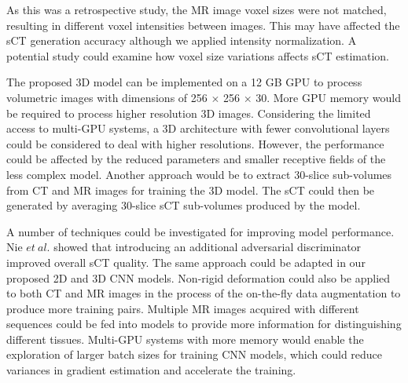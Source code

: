 As this was a retrospective study, the MR image voxel sizes were not matched, resulting in different voxel intensities between images. This may have affected the sCT generation accuracy although we applied intensity normalization. A potential study could examine how voxel size variations affects sCT estimation. 

The proposed 3D model can be implemented on a 12 GB GPU to process volumetric images with dimensions of 256 $\times$ 256 $\times$ 30. More GPU memory would be required to process higher resolution 3D images. Considering the limited access to multi-GPU systems, a 3D architecture with fewer convolutional layers could be considered to deal with higher resolutions. However, the performance could be affected by the reduced parameters and smaller receptive fields of the less complex model. Another approach would be to extract 30-slice sub-volumes from CT and MR images for training the 3D model. The sCT could then be generated by averaging 30-slice sCT sub-volumes produced by the model. 

A number of techniques could be investigated for improving model performance.  Nie $et \ al.$\cite{RN26} showed that introducing an additional adversarial discriminator improved overall sCT quality. The same approach could be adapted in our proposed 2D and 3D CNN models.  Non-rigid deformation\cite{RN44} could also be applied to both CT and MR images in the process of the on-the-fly data augmentation to produce more training pairs. Multiple MR images acquired with different sequences could be fed into models to provide more information for distinguishing different tissues. Multi-GPU systems with more memory would enable the exploration of larger batch sizes for training CNN models, which could reduce variances in gradient estimation and accelerate the training. 

